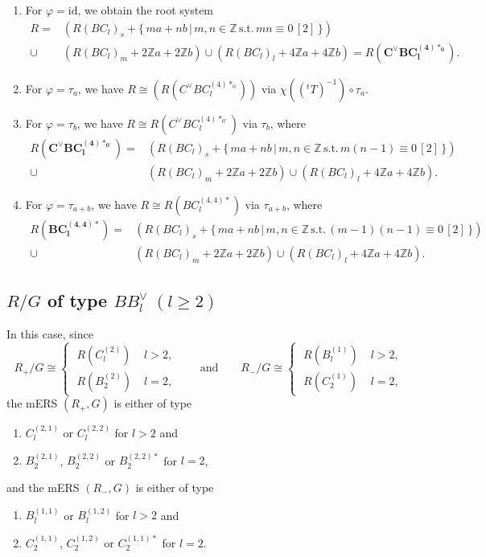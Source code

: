 \documentclass[11pt]{amsart}
\newcommand{\Z}{\mathbb{Z}}
\newcommand{\id}{\mathrm{id}}
\begin{document}
\begin{enumerate}
\begin{enumerate}
\item[(i)] For $\varphi=\id$, we obtain the root system
\begin{align*}
R=
&(R(BC_l)_s+\{\, ma+nb\, \vert\, m,n \in \Z\, \text{s.t.}\, mn\equiv 0\, [2]\, \}) \\
\cup
&(R(BC_l)_m+2\Z a+2\Z b)  \cup (R(BC_l)_l+4\Z a+4\Z b) =R(\mathbf{C^\vee BC_l^{(4)\ast_0}}).
\end{align*}
\item[(ii)] For $\varphi=\tau_a$, we have $R\cong (R(C^\vee BC_l^{(4)\ast_0}))$ via $\chi(({}^tT)^{-1}) \circ \tau_a$. 
\item[(iii)] For $\varphi=\tau_b$, we have $R \cong R(C^\vee BC_l^{(4)\ast_{0'}})$ via $\tau_b$, where
\begin{align*}
R(\mathbf{C^\vee BC_l^{(4)\ast_{0'}}})=
&(R(BC_l)_s+\{\, ma+nb\, \vert\, m,n \in \Z\, \text{s.t.}\, m(n-1)\equiv 0\, [2]\, \}) \\
\cup
&(R(BC_l)_m+2\Z a+2\Z b)  \cup (R(BC_l)_l+4\Z a+4\Z b).
\end{align*}
\item[(iv)] For $\varphi=\tau_{a+b}$, we have $R \cong R(BC_l^{(4,4)\ast})$ via $\tau_{a+b}$, where
\begin{align*}
R(\mathbf{BC_l^{(4,4)\ast}})=
&(R(BC_l)_s+\{\, ma+nb\, \vert\, m,n \in \Z\, \text{s.t.}\, (m-1)(n-1)\equiv 0\, [2]\, \}) \\
\cup
&(R(BC_l)_m+2\Z a+2\Z b)  \cup (R(BC_l)_l+4\Z a+4\Z b).
\end{align*}
\end{enumerate}
\end{enumerate}





\subsection{$R/G$ of type $BB_l^\vee \; (l\geq 2)$}\label{subsubsect_BB-l}
In this case, since 
\[ R_+/G \cong \begin{cases} \; R(C_l^{(2)}) \; &l>2, \\ \; R(B_2^{(2)})\; &l=2, \end{cases} \qquad 
\text{and} \qquad
  R_-/G \cong \begin{cases} \; R(B_l^{(1)}) \; &l>2, \\ \; R(C_2^{(1)})\; &l=2, \end{cases}
\]
the mERS $(R_+,G)$ is either of type
\begin{enumerate}
\item $C_l^{(2,1)}$ or $C_l^{(2,2)}$ for $l>2$ and
\item $B_2^{(2,1)}$, $B_2^{(2,2)}$ or $B_2^{(2,2)\ast}$ for $l=2$,
\end{enumerate}
and the mERS $(R_-,G)$ is either of type 
\begin{enumerate}
\item $B_l^{(1,1)}$ or $B_l^{(1,2)}$ for $l>2$ and
\item $C_2^{(1,1)}$, $C_2^{(1,2)}$ or $C_2^{(1,1)\ast}$ for $l=2$. 
\end{enumerate}
\vskip 0.1in
\end{document}
